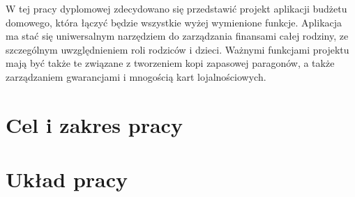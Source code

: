 W tej pracy dyplomowej zdecydowano się przedstawić projekt aplikacji budżetu domowego, która łączyć będzie wszystkie wyżej wymienione funkcje. Aplikacja ma stać się uniwersalnym narzędziem do zarządzania finansami całej rodziny, ze szczególnym uwzględnieniem roli rodziców i dzieci. Ważnymi funkcjami projektu mają być także te związane z tworzeniem kopi zapasowej paragonów, a także zarządzaniem gwarancjami i mnogością kart lojalnościowych.
\section{Cel i zakres pracy}

\section{Układ pracy}
